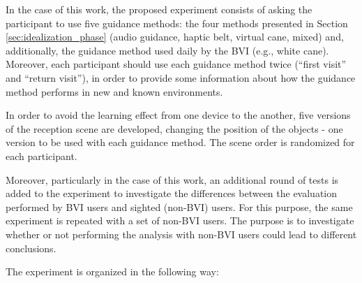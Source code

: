 In the case of this work, the proposed experiment consists of asking the participant to use five guidance methods: the four methods presented in Section \ref{sec:idealization_phase} (audio guidance, haptic belt, virtual cane, mixed) and, additionally, the guidance method used daily by the BVI (e.g., white cane). Moreover, each participant should use each guidance method twice (“first visit” and “return visit”), in order to provide some information about how the guidance method performs in new and known environments.

In order to avoid the learning effect from one device to the another, five versions of the reception scene are developed, changing the position of the objects - one version to be used with each guidance method. The scene order is randomized for each participant.

Moreover, particularly in the case of this work, an additional round of tests is added to the experiment to investigate the differences between the evaluation performed by BVI users and sighted (non-BVI) users. For this purpose, the same experiment is repeated with a set of non-BVI users. The purpose is to investigate whether or not performing the analysis with non-BVI users could lead to different conclusions.

The experiment is organized in the following way:

